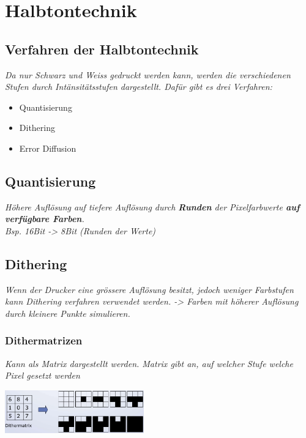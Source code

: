\section{Halbtontechnik}

\subsection{Verfahren der Halbtontechnik}

\textit{
    Da nur Schwarz und Weiss gedruckt werden kann, werden
    die verschiedenen Stufen durch Intänsitätsstufen
    dargestellt. Dafür gibt es drei Verfahren:
}

\begin{itemize}
    \item Quantisierung
    \item Dithering
    \item Error Diffusion
\end{itemize}

\subsection{Quantisierung}

\textit{
    Höhere Auflösung auf tiefere Auflösung durch \textbf{Runden}
    der Pixelfarbwerte \textbf{auf verfügbare Farben}.\\
    Bsp. 16Bit -> 8Bit (Runden der Werte)
}

\subsection{Dithering}

\textit{
    Wenn der Drucker eine grössere Auflösung besitzt,
    jedoch weniger Farbstufen kann Dithering verfahren
    verwendet werden. -> Farben mit höherer Auflösung durch kleinere Punkte simulieren.
} \\

\subsubsection{Dithermatrizen}

\textit{
    Kann als Matrix dargestellt werden. Matrix gibt an,
    auf welcher Stufe welche Pixel gesetzt werden
}

\includegraphics[width=0.45\textwidth]{assets/dithermatrix.png}

